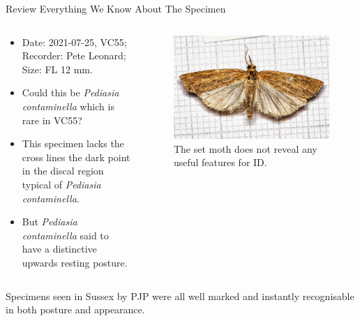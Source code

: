 \documentclass[
  ignorenonframetext,
]{beamer}
\providecommand{\tightlist}{%
  \setlength{\itemsep}{0pt}\setlength{\parskip}{0pt}}
\begin{document}
\begin{frame}{Review Everything We Know About The Specimen}
\protect\hypertarget{review-everything-we-know-about-the-specimen}{}
\begin{columns}[T]
\begin{column}{0.5\textwidth}
\begin{itemize}
\tightlist
\item
  Date: 2021-07-25, VC55; Recorder: Pete Leonard; Size: FL 12 mm.
\item
  Could this be \emph{Pediasia contaminella} which is rare in VC55?
\item
  This specimen lacks the cross lines the dark point in the discal
  region typical of \emph{Pediasia contaminella}.
\item
  But \emph{Pediasia contaminella} said to have a distinctive upwards
  resting posture.
\end{itemize}
\end{column}

\begin{column}{0.5\textwidth}
\begin{figure}
\centering
\includegraphics{./images/PJP20220218-0001a.jpg}
\caption{The set moth does not reveal any useful features for ID.}
\end{figure}
\end{column}
\end{columns}

Specimens seen in Sussex by PJP were all well marked and instantly
recognisable in both posture and appearance.
\end{frame}
\end{document}

